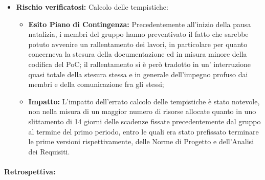 \begin{itemize}
\item \textbf{Rischio verificatosi:} Calcolo delle tempistiche:
\begin{itemize}
    \item \textbf{Esito Piano di Contingenza:} Precedentemente all'inizio della pausa natalizia, i membri del gruppo hanno preventivato il fatto che sarebbe potuto avvenire un rallentamento dei lavori, in particolare per quanto concerneva la stesura della documentazione ed in misura minore della codifica del PoC; il rallentamento si è però tradotto in un' interruzione quasi totale della stesura stessa e in generale dell'impegno profuso dai membri e della comunicazione fra gli stessi;
    \item \textbf{Impatto:} L'impatto dell'errato calcolo delle tempistiche è stato notevole, non nella misura di un maggior numero di risorse allocate quanto in uno slittamento di 14 giorni delle scadenze fissate precedentemente dal gruppo al termine del primo periodo, entro le quali era stato prefissato terminare le prime versioni rispettivamente, delle Norme di Progetto e dell'Analisi dei Requisiti.
\end{itemize}
\end{itemize}

\paragraph{}
\textbf{Retrospettiva:} 

